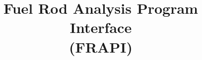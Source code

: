\documentclass[11pt]{beamer}
\title{Fuel Rod Analysis Program Interface \\(FRAPI)}
\institute{UNIST Core}
\begin{document}
\titlepage











































\end{document}

